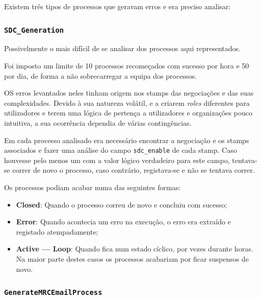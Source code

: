         Existem três tipos de processos que geravam erros e era preciso analisar:

        \subsubsection{\texttt{SDC\_Generation}}\label{secsec:sdc_generation}


            Possivelmente o mais difícil de se analisar dos processos aqui representados.
            
            Foi imposto um limite de 10 processos recomeçados com sucesso por hora e 50 por dia, de forma a não sobrecarregar a equipa dos processos.

            OS erros levantados neles tinham origem nos stamps das negociações e das suas complexidades. Devido à sua natureza volátil, e a criarem \textit{roles} diferentes para utilizadores e terem uma lógica de pertença a utilizadores e organizações pouco intuitiva, a sua ocorrência dependia de várias contingências.

            Em cada processo analisado era necessário encontrar a negociação e os stamps associados e fazer uma análise do campo \texttt{sdc\_enable} de cada stamp. Caso houvesse pelo menos um com a valor lógico verdadeiro para este campo, tentava-se correr de novo o processo, caso contrário, registava-se e não se tentava correr.
             
            Os processos podiam acabar numa das seguintes formas:
            \begin{itemize}
                \item \textbf{Closed}: Quando o processo correu de novo e concluiu com sucesso;
                \item \textbf{Error}: Quando acontecia um erro na execução, o erro era extraído e registado atempadamente;
                \item \textbf{Active --- Loop}: Quando fica num estado cíclico, por vezes durante horas. Na maior parte destes casos os processos acabariam por ficar suspensos de novo.
            \end{itemize}

        \subsubsection{\texttt{GenerateMRCEmailProcess}}\label{secsec:generate_mrc_email_process}

